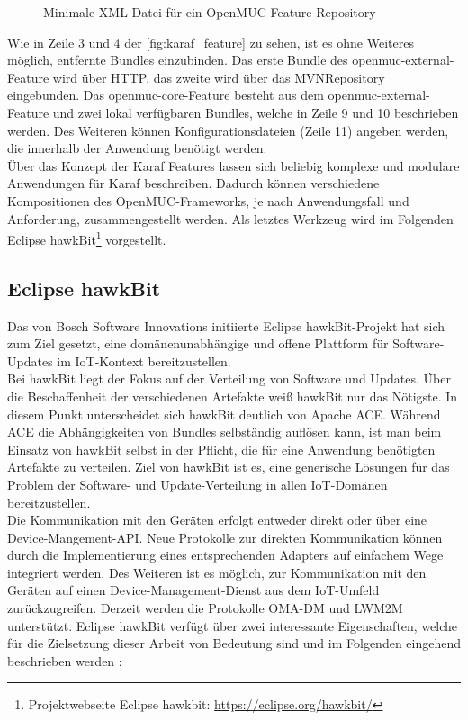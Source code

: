 \begin{figure}[h]
 \centering

 
 \caption{Minimale XML-Datei für ein OpenMUC Feature-Repository}
 \label{fig:karaf_feature}
\end{figure}

Wie in Zeile 3 und 4 der \autoref{fig:karaf_feature} zu sehen, ist es ohne Weiteres möglich, entfernte Bundles einzubinden.
Das erste Bundle des openmuc-external-Feature wird über \ac{HTTP}, das zweite wird über das MVNRepository eingebunden.
Das openmuc-core-Feature besteht aus dem openmuc-external-Feature und zwei lokal verfügbaren Bundles, welche in Zeile 9 und 10 beschrieben werden.
Des Weiteren können Konfigurationsdateien (Zeile 11) angeben werden, die innerhalb der Anwendung benötigt werden.\\

Über das Konzept der Karaf Features lassen sich beliebig komplexe und modulare Anwendungen für Karaf beschreiben.
Dadurch können verschiedene Kompositionen des OpenMUC-Frameworks, je nach Anwendungsfall und Anforderung, zusammengestellt werden.
Als letztes Werkzeug wird im Folgenden Eclipse hawkBit\footnote{Projektwebseite Eclipse hawkbit: \url{https://eclipse.org/hawkbit/}} vorgestellt.

\subsection{Eclipse hawkBit}

\glqq Das von Bosch Software Innovations initiierte Eclipse hawkBit-Projekt hat sich zum Ziel gesetzt,
eine domänenunabhängige und offene Plattform für Software-Updates im IoT-Kontext bereitzustellen. \grqq \cite{heise_hawkbit}\\

Bei hawkBit liegt der Fokus auf der Verteilung von Software und Updates. Über die Beschaffenheit der verschiedenen Artefakte 
weiß hawkBit nur das Nötigste. In diesem Punkt unterscheidet sich hawkBit deutlich von Apache ACE. Während ACE die Abhängigkeiten
von Bundles selbständig auflösen kann, ist man beim Einsatz von hawkBit selbst in der Pflicht, die für eine Anwendung benötigten Artefakte zu verteilen.
Ziel von hawkBit ist es, eine generische Lösungen für das Problem der Software- und Update-Verteilung in allen \ac{IoT}-Domänen bereitzustellen.\\

Die Kommunikation mit den Geräten erfolgt entweder direkt oder über eine Device-Mangement-\ac{API}.
Neue Protokolle zur direkten Kommunikation können durch die Implementierung eines entsprechenden Adapters auf einfachem Wege integriert werden.
Des Weiteren ist es möglich, zur Kommunikation mit den Geräten auf einen Device-Management-Dienst aus dem \ac{IoT}-Umfeld zurückzugreifen. 
Derzeit werden die Protokolle \ac{OMA-DM} und \ac{LWM2M} unterstützt. Eclipse hawkBit verfügt über zwei interessante Eigenschaften, welche für die 
Zielsetzung dieser Arbeit von Bedeutung sind und im Folgenden eingehend beschrieben werden \cite{hawkbit}:

